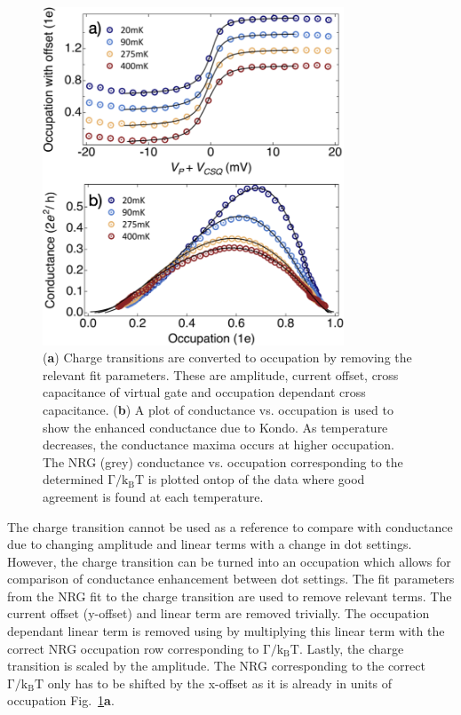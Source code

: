 \begin{figure}[!bht]
  \begin{center}
    \includegraphics[width=0.8\textwidth]{figures/ch3/crop_FiguresMaster.014.png}
    \caption[Method to determine occupation and plot conductance vs. occupation]{\label{fig:ch3/cond_vs_occ_gf} 
    (\textbf{a}) Charge transitions are converted to occupation by removing the relevant fit parameters. These are amplitude, current offset, cross capacitance of virtual gate and occupation dependant cross capacitance. (\textbf{b}) A plot of conductance vs. occupation is used to show the enhanced conductance due to Kondo. As temperature decreases, the conductance maxima occurs at higher occupation. The NRG (grey) conductance vs. occupation corresponding to the determined $\mathrm{\Gamma/k_BT}$ is plotted ontop of the data where good agreement is found at each temperature.}
  \end{center}
\end{figure}

The charge transition cannot be used as a reference to compare with conductance due to changing amplitude and linear terms with a change in dot settings. However, the charge transition can be turned into an occupation which allows for comparison of conductance enhancement between dot settings. The fit parameters from the NRG fit to the charge transition are used to remove relevant terms. The current offset (y-offset) and linear term are removed trivially. The occupation dependant linear term is removed using by multiplying this linear term with the correct NRG occupation row corresponding to $\mathrm{\Gamma/k_BT}$. Lastly, the charge transition is scaled by the amplitude. The NRG corresponding to the correct $\mathrm{\Gamma/k_BT}$ only has to be shifted by the x-offset as it is already in units of occupation Fig.~\ref{fig:ch3/cond_vs_occ_gf}\textbf{a}.


